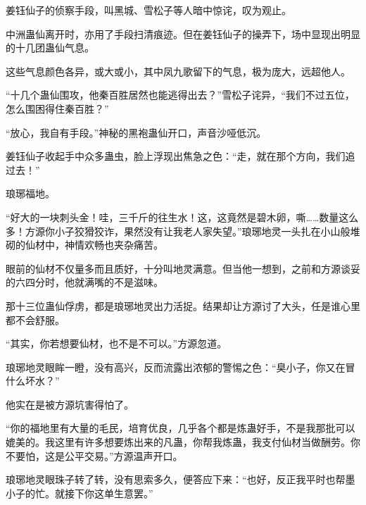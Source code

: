 \begin{this_body}
姜钰仙子的侦察手段，叫黑城、雪松子等人暗中惊诧，叹为观止。

中洲蛊仙离开时，亦用了手段扫清痕迹。但在姜钰仙子的操弄下，场中显现出明显的十几团蛊仙气息。

这些气息颜色各异，或大或小，其中凤九歌留下的气息，极为庞大，远超他人。

“十几个蛊仙围攻，他秦百胜居然也能逃得出去？”雪松子诧异，“我们不过五位，怎么围困得住秦百胜？”

“放心，我自有手段。”神秘的黑袍蛊仙开口，声音沙哑低沉。

姜钰仙子收起手中众多蛊虫，脸上浮现出焦急之色：“走，就在那个方向，我们追过去！”

琅琊福地。

“好大的一块刺头金！哇，三千斤的往生水！这，这竟然是碧木卵，嘶……数量这么多！方源你小子狡猾狡诈，果然没有让我老人家失望。”琅琊地灵一头扎在小山般堆砌的仙材中，神情欢畅也夹杂痛苦。

眼前的仙材不仅量多而且质好，十分叫地灵满意。但当他一想到，之前和方源谈妥的六四分时，他就满嘴的不是滋味。

那十三位蛊仙俘虏，都是琅琊地灵出力活捉。结果却让方源讨了大头，任是谁心里都不会舒服。

“其实，你若想要仙材，也不是不可以。”方源忽道。

琅琊地灵眼眸一瞪，没有高兴，反而流露出浓郁的警惕之色：“臭小子，你又在冒什么坏水？”

他实在是被方源坑害得怕了。

“你的福地里有大量的毛民，培育优良，几乎各个都是炼蛊好手，不是我那批可以媲美的。我这里有许多想要炼出来的凡蛊，你帮我炼蛊，我支付仙材当做酬劳。你不要怕，这是公平交易。”方源温声开口。

琅琊地灵眼珠子转了转，没有思索多久，便答应下来：“也好，反正我平时也帮墨小子的忙。就接下你这单生意罢。”

\end{this_body}

